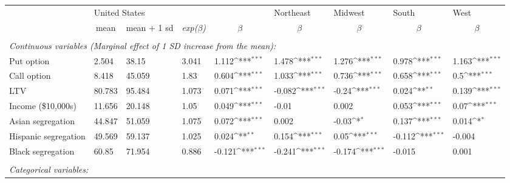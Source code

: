 
{
\def\sym#1{\ifmmode^{#1}\else\(^{#1}\)\fi}
\begin{tabular}{l*{8}{l}} \hline\hline
& \multicolumn{4}{l}{United States} & Northeast & Midwest & South & West \\ \cmidrule(l){2-5} \cmidrule(l){6-9}

& \multicolumn{1}{c}{mean} & \multicolumn{1}{c}{mean + 1 sd} & \multicolumn{1}{c}{\emph{exp($\beta$)}} & \multicolumn{1}{c}{\emph{$\beta$}} & \multicolumn{1}{c}{\emph{$\beta$}} & \multicolumn{1}{c}{\emph{$\beta$}} & \multicolumn{1}{c}{\emph{$\beta$}} & \multicolumn{1}{c}{\emph{$\beta$}} \\ \hline

\multicolumn{9}{l}{}\\
\multicolumn{9}{l}{\emph{Continuous variables (Marginal effect of 1 SD increase from the mean):}} \\

\hspace{5mm} Put option&2.504&38.15&3.041&1.112\sym{***}&1.478\sym{***}&1.276\sym{***}&0.978\sym{***}&1.163\sym{***}\\
\hspace{5mm} Call option&8.418&45.059&1.83&0.604\sym{***}&1.033\sym{***}&0.736\sym{***}&0.658\sym{***}&0.5\sym{***}\\
\hspace{5mm} LTV &80.783&95.484&1.073&0.071\sym{***}&-0.082\sym{***}&-0.24\sym{***}&0.024\sym{**}&0.139\sym{***}\\
\hspace{5mm} Income (\$10,000s)&11.656&20.148&1.05&0.049\sym{***}&-0.01&0.002&0.053\sym{***}&0.07\sym{***}\\
\hspace{5mm} Asian segregation&44.847&51.059&1.075&0.072\sym{***}&0.002&-0.03\sym{*}&0.137\sym{***}&0.014\sym{*}\\
\hspace{5mm} Hispanic segregation&49.569&59.137&1.025&0.024\sym{**}&0.154\sym{***}&0.05\sym{***}&-0.112\sym{***}&-0.004\\
\hspace{5mm} Black segregation&60.85&71.954&0.886&-0.121\sym{***}&-0.241\sym{***}&-0.174\sym{***}&-0.015&0.001\\

\multicolumn{9}{l}{}\\
\multicolumn{9}{l}{\emph{Categorical variables:}} \\


\end{tabular}}
